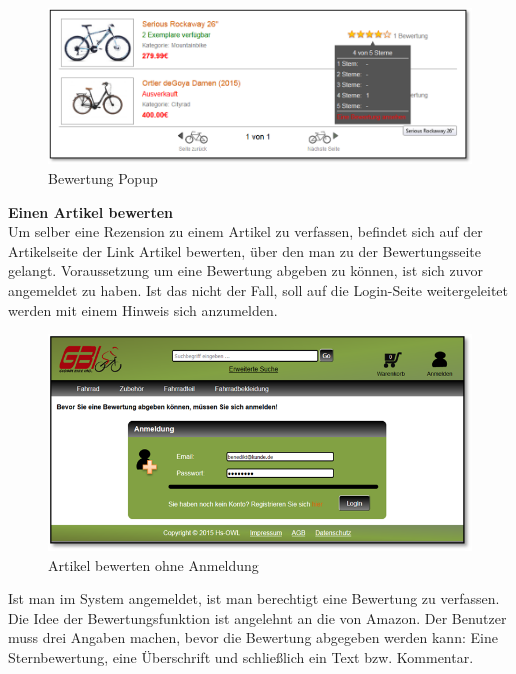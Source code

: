 \begin{figure}[H]
\begin{center}
\includegraphics[width=12cm]{Bilder/Michael_Abbildung10-BewertungPopup.png}
\end{center}
\caption{Bewertung Popup}
\end{figure}

\textbf{Einen Artikel bewerten}
\\
Um selber eine Rezension zu einem Artikel zu verfassen, befindet sich auf der Artikelseite der Link \glqq Artikel bewerten\grqq{}, über den man zu der Bewertungsseite gelangt. 
Voraussetzung um eine Bewertung abgeben zu können, ist sich zuvor angemeldet zu haben. Ist das nicht der Fall, soll auf die Login-Seite weitergeleitet werden mit einem Hinweis sich anzumelden.

\begin{figure}[H]
\begin{center}
\includegraphics[width=12cm]{Bilder/Michael_Abbildung11-ArtikelBewertenOhneAnmeldung.png}
\end{center}
\caption{Artikel bewerten ohne Anmeldung}
\end{figure}

Ist man im System angemeldet, ist man berechtigt eine Bewertung zu verfassen.
Die Idee der Bewertungsfunktion ist angelehnt an die von Amazon. Der Benutzer muss drei Angaben machen, bevor die Bewertung abgegeben werden kann: Eine Sternbewertung, eine Überschrift und schließlich ein Text bzw. Kommentar. 

